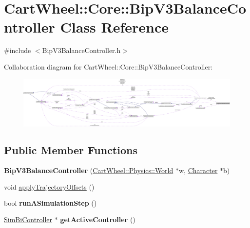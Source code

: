 \hypertarget{classCartWheel_1_1Core_1_1BipV3BalanceController}{
\section{CartWheel::Core::BipV3BalanceController Class Reference}
\label{classCartWheel_1_1Core_1_1BipV3BalanceController}
}


{\ttfamily \#include $<$BipV3BalanceController.h$>$}



Collaboration diagram for CartWheel::Core::BipV3BalanceController:\nopagebreak
\begin{figure}[H]
\begin{center}
\leavevmode
\includegraphics[width=400pt]{classCartWheel_1_1Core_1_1BipV3BalanceController__coll__graph}
\end{center}
\end{figure}
\subsection*{Public Member Functions}
\begin{DoxyCompactItemize}
\item 
\hypertarget{classCartWheel_1_1Core_1_1BipV3BalanceController_a63c56c566d91c9d3be3ea4a4ba3a120b}{
{\bfseries BipV3BalanceController} (\hyperlink{classCartWheel_1_1Physics_1_1World}{CartWheel::Physics::World} $\ast$w, \hyperlink{classCartWheel_1_1Core_1_1Character}{Character} $\ast$b)}
\label{classCartWheel_1_1Core_1_1BipV3BalanceController_a63c56c566d91c9d3be3ea4a4ba3a120b}

\item 
void \hyperlink{classCartWheel_1_1Core_1_1BipV3BalanceController_a8414520a87f159250443f0f07c5f162b}{applyTrajectoryOffsets} ()
\item 
\hypertarget{classCartWheel_1_1Core_1_1BipV3BalanceController_a4a892343e46c19e662bc444ce425df3f}{
bool {\bfseries runASimulationStep} ()}
\label{classCartWheel_1_1Core_1_1BipV3BalanceController_a4a892343e46c19e662bc444ce425df3f}

\item 
\hypertarget{classCartWheel_1_1Core_1_1BipV3BalanceController_ac9eefeaeed989fff162bf947bad19530}{
\hyperlink{classCartWheel_1_1Core_1_1SimBiController}{SimBiController} $\ast$ {\bfseries getActiveController} ()}
\label{classCartWheel_1_1Core_1_1BipV3BalanceController_ac9eefeaeed989fff162bf947bad19530}

\end{DoxyCompactItemize}


